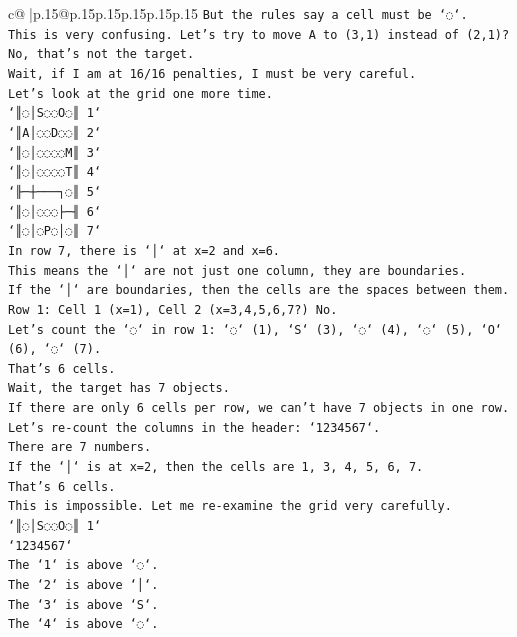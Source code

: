\documentclass{article}
\begin{document}
{\begin{supertabular}{c@{$\;$}|p{.15\linewidth}@{}p{.15\linewidth}p{.15\linewidth}p{.15\linewidth}p{.15\linewidth}p{.15\linewidth}}
{{{\texttt{But the rules say a cell must be `◌`.} \\
\texttt{This is very confusing. Let's try to move A to (3,1) instead of (2,1)? No, that's not the target.} \\
\texttt{Wait, if I am at 16/16 penalties, I must be very careful.} \\
\texttt{Let's look at the grid one more time.} \\
\texttt{`║◌│S◌◌O◌║ 1`} \\
\texttt{`║A│◌◌D◌◌║ 2`} \\
\texttt{`║◌│◌◌◌◌M║ 3`} \\
\texttt{`║◌│◌◌◌◌T║ 4`} \\
\texttt{`╟─┼───┐◌║ 5`} \\
\texttt{`║◌│◌◌◌├─╢ 6`} \\
\texttt{`║◌│◌P◌│◌║ 7`} \\
\texttt{In row 7, there is `│` at x=2 and x=6.} \\
\texttt{This means the `│` are not just one column, they are boundaries.} \\
\texttt{If the `│` are boundaries, then the cells are the spaces between them.} \\
\texttt{Row 1: Cell 1 (x=1), Cell 2 (x=3,4,5,6,7?) No.} \\
\texttt{Let's count the `◌` in row 1: `◌` (1), `S` (3), `◌` (4), `◌` (5), `O` (6), `◌` (7).} \\
\texttt{That's 6 cells.} \\
\texttt{Wait, the target has 7 objects.} \\
\texttt{If there are only 6 cells per row, we can't have 7 objects in one row.} \\
\texttt{Let's re{-}count the columns in the header: `1234567`.} \\
\texttt{There are 7 numbers.} \\
\texttt{If the `│` is at x=2, then the cells are 1, 3, 4, 5, 6, 7.} \\
\texttt{That's 6 cells.} \\
\texttt{This is impossible. Let me re{-}examine the grid very carefully.} \\
\texttt{`║◌│S◌◌O◌║ 1`} \\
\texttt{`1234567`} \\
\texttt{The `1` is above `◌`.} \\
\texttt{The `2` is above `│`.} \\
\texttt{The `3` is above `S`.} \\
\texttt{The `4` is above `◌`.} \\
}}}
\end{supertabular}}
\end{document}

